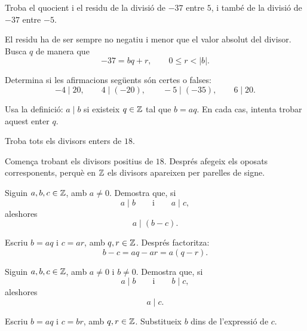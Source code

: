 \begin{exercici}
Troba el quocient i el residu de la divisió de \(-37\) entre \(5\), i també de la divisió de \(-37\) entre \(-5\).
\end{exercici}

\begin{indicacio}
El residu ha de ser sempre no negatiu i menor que el valor absolut del divisor. Busca \(q\) de manera que
\[
-37=bq+r,\qquad 0\leq r<|b|.
\]
\end{indicacio}


\begin{exercici}[Divisibilitat en \(\Z\)]
Determina si les afirmacions següents són certes o falses:
\[
-4\mid20,
\qquad
4\mid(-20),
\qquad
-5\mid(-35),
\qquad
6\mid20.
\]
\end{exercici}

\begin{indicacio}
Usa la definició: \(a\mid b\) si existeix \(q\in\mathbb{Z}\) tal que \(b=aq\). En cada cas, intenta trobar aquest enter \(q\).
\end{indicacio}


\begin{exercici}
Troba tots els divisors enters de \(18\).
\end{exercici}

\begin{indicacio}
Comença trobant els divisors positius de \(18\). Després afegeix els oposats corresponents, perquè en \(\Z\) els divisors apareixen per parelles de signe.
\end{indicacio}


\begin{exercici}
Siguin \(a,b,c\in\mathbb{Z}\), amb \(a\neq0\). Demostra que, si
\[
a\mid b
\qquad\text{i}\qquad
a\mid c,
\]
aleshores
\[
a\mid(b-c).
\]
\end{exercici}

\begin{indicacio}
Escriu \(b=aq\) i \(c=ar\), amb \(q,r\in\mathbb{Z}\). Després factoritza:
\[
b-c=aq-ar=a(q-r).
\]
\end{indicacio}


\begin{exercici}
Siguin \(a,b,c\in\mathbb{Z}\), amb \(a\neq0\) i \(b\neq0\). Demostra que, si
\[
a\mid b
\qquad\text{i}\qquad
b\mid c,
\]
aleshores
\[
a\mid c.
\]
\end{exercici}

\begin{indicacio}
Escriu \(b=aq\) i \(c=br\), amb \(q,r\in\mathbb{Z}\). Substitueix \(b\) dins de l'expressió de \(c\).
\end{indicacio}

